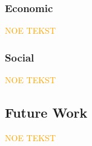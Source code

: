 \subsubsection*{Economic}

\textcolor{orange}{NOE TEKST}

\subsubsection*{Social}

\textcolor{orange}{NOE TEKST}

\subsection{Future Work}
\begin{comment}
    - User Guide
    - Offline Mode (download a map with data)
    - Mobile
    - Export Data
    - Machine Learning
    - Notification System
    - Better Accessibility (e.g. color-blind modes)
    - Hour picker (for mer detaljert data for spesifikke tidspunk, f.eks. om en sjåfør skal kjøre om natten)
    - More Optimization?
        - WebGL for rendering of vectors (downside?: does require newer hardware/browsers)
    - Code Quality, what to add to improve?
\end{comment}

\textcolor{orange}{NOE TEKST}
